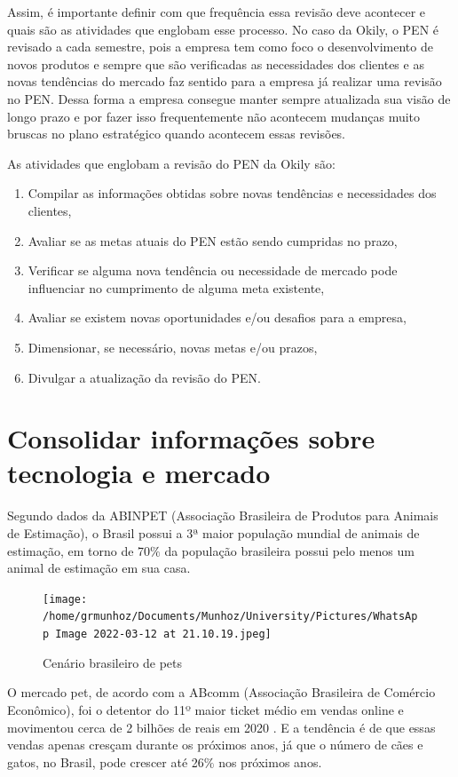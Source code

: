 \documentclass[
	12pt,				%
	openright,			%
	oneside,			%
	a4paper,			%
	english,			%
	french,				%
	spanish,			%
	brazil				%
	]{abntex2}
\begin{document}
Assim, é importante definir com que frequência essa revisão deve acontecer e quais são as atividades que englobam esse processo. No caso da Okily, o PEN é revisado a cada semestre, pois a empresa tem como foco o desenvolvimento de novos produtos e sempre que são verificadas as necessidades dos clientes e as novas tendências do mercado faz sentido para a empresa já realizar uma revisão no PEN. Dessa forma a empresa consegue manter sempre atualizada sua visão de longo prazo e por fazer isso frequentemente não acontecem mudanças muito bruscas no plano estratégico quando acontecem essas revisões.

As atividades que englobam a revisão do PEN da Okily são: 
\begin{enumerate}
\item Compilar as informações obtidas sobre novas tendências e necessidades dos clientes,
\item Avaliar se as metas atuais do PEN estão sendo cumpridas no prazo,
\item Verificar se alguma nova tendência ou necessidade de mercado pode influenciar no cumprimento de alguma meta existente,
\item Avaliar se existem novas oportunidades e/ou desafios para a empresa,
\item Dimensionar, se necessário, novas metas e/ou prazos,
\item Divulgar a atualização da revisão do PEN.
\end{enumerate}


\section{Consolidar informações sobre tecnologia e mercado}

Segundo dados da ABINPET (Associação Brasileira de Produtos para Animais de Estimação), o Brasil possui a 3ª maior população mundial de animais de estimação, em torno de 70$\%$ da população brasileira possui pelo menos um animal de estimação em sua casa. \cite{abinpet} 

\begin{figure}[H]
\begin{center}
\caption{Cenário brasileiro de pets}
\texttt{[image: /home/grmunhoz/Documents/Munhoz/University/Pictures/WhatsApp Image 2022-03-12 at 21.10.19.jpeg]} 
\label{figmercado}
\end{center}
\end{figure}

O mercado pet, de acordo com a ABcomm (Associação Brasileira de Comércio Econômico), foi o detentor do 11º maior ticket médio em vendas online e movimentou cerca de 2 bilhões de reais em 2020 \cite{abcomm}. E a tendência é de que essas vendas apenas cresçam durante os próximos anos, já que o número de cães e gatos, no Brasil, pode crescer até 26$\%$ nos próximos anos. \cite{fgv}
\end{document}
